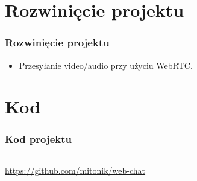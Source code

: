 \documentclass[aspectratio=169]{beamer}
\begin{document}
\section{Rozwinięcie projektu}
\begin{frame}
  \frametitle{Rozwinięcie projektu}
  \begin{itemize}
    \item Przesyłanie video/audio przy użyciu WebRTC.
  \end{itemize}
\end{frame}
\section{Kod}
\begin{frame}
  \frametitle{Kod projektu}
  \begin{columns}
    \begin{column}{.6\linewidth}
      \begin{center}
        \url{https://github.com/mitonik/web-chat}
      \end{center}
    \end{column}
    \begin{column}{.4\linewidth}
      \begin{center}
      \end{center}
    \end{column}
  \end{columns}
\end{frame}
\end{document}
